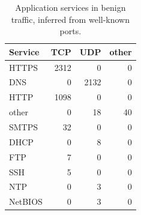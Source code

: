 \begin{table}[htbp]
\centering
\caption{Application services in benign traffic, inferred from well-known ports.}
\label{tab:benign_services}
\begin{tabular}{lrrr}
\toprule
Service & TCP & UDP & other \\
\midrule
HTTPS & 2312 & 0 & 0 \\
DNS & 0 & 2132 & 0 \\
HTTP & 1098 & 0 & 0 \\
other & 0 & 18 & 40 \\
SMTPS & 32 & 0 & 0 \\
DHCP & 0 & 8 & 0 \\
FTP & 7 & 0 & 0 \\
SSH & 5 & 0 & 0 \\
NTP & 0 & 3 & 0 \\
NetBIOS & 0 & 3 & 0 \\
\bottomrule
\end{tabular}
\end{table}
